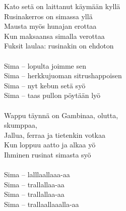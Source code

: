 Kato setä on laittanut käymään kyllä \\
Rusinakerros on simassa yllä \\
Mausta myös hunajan erottaa \\
Kun maksaansa simalla verottaa \\
Fuksit laulaa: rusinakin on ehdoton \\
\hspace{10mm} \\
Sima – lopulta joimme sen \\
Sima – herkkujuoman sitrushappoisen \\
Sima – nyt kebun setä syö \\
Sima – taas pullon pöytään lyö \\
\hspace{10mm} \\
Wappu täynnä on Gambinaa, olutta,\\
skumppaa, \\
Jallua, ferraa ja tietenkin votkaa \\
Kun loppuu aatto ja alkaa yö \\
Ihminen rusinat simasta syö \\
\hspace{10mm} \\
Sima – lalllaallaaa-aa \\
Sima – trallallaa-aa \\
Sima – trallallaa-aa \\
Sima – trallaallaaalla-aa \\
